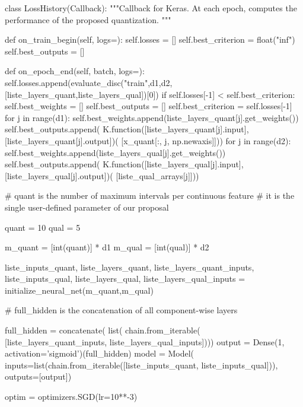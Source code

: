 \begin{pylisting}
    
    class LossHistory(Callback):
        """Callback for Keras. At each epoch, computes the performance of the proposed quantization.
	    """

        def on_train_begin(self, logs={}):
            self.losses = []
            self.best_criterion = float("inf")
            self.best_outputs = []

        def on_epoch_end(self, batch, logs={}):
            self.losses.append(evaluate_disc("train",d1,d2,[liste_layers_quant,liste_layers_qual])[0])
            if self.losses[-1] < self.best_criterion:
                self.best_weights = []
                self.best_outputs = []
                self.best_criterion = self.losses[-1]
                for j in range(d1):
                    self.best_weights.append(liste_layers_quant[j].get_weights())
                    self.best_outputs.append(
                        K.function([liste_layers_quant[j].input],
                                   [liste_layers_quant[j].output])(
                                       [x_quant[:, j, np.newaxis]]))
                for j in range(d2):
                    self.best_weights.append(liste_layers_qual[j].get_weights())
                    self.best_outputs.append(
                        K.function([liste_layers_qual[j].input],
                                   [liste_layers_qual[j].output])(
                                       [liste_qual_arrays[j]]))
    
    
	# quant is the number of maximum intervals per continuous feature
	# it is the single user-defined parameter of our proposal    
    
    quant = 10
    qual = 5

    m_quant = [int(quant)] * d1
    m_qual = [int(qual)] * d2

	liste_inputs_quant, liste_layers_quant, liste_layers_quant_inputs, liste_inputs_qual, liste_layers_qual, liste_layers_qual_inputs = initialize_neural_net(m_quant,m_qual)

	# full_hidden is the concatenation of all component-wise layers
	
    full_hidden = concatenate(
        list(
          chain.from_iterable(
              [liste_layers_quant_inputs, liste_layers_qual_inputs])))
    output = Dense(1, activation='sigmoid')(full_hidden)
    model = Model(
      inputs=list(chain.from_iterable([liste_inputs_quant, liste_inputs_qual])),
      outputs=[output])  

    optim = optimizers.SGD(lr=10**-3)       
 

\end{pylisting}
